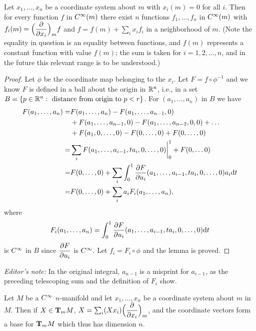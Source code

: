 \documentclass[../main]{subfiles}
\begin{document}
\begin{lemma} \label{lem:ch1.3.1}
Let $x_1, \dots, x_n$ be a coordinate system about $m$ with $x_i(m)=0$ for all $i$. Then for every function $f$ in $\CInfty(m)$ there exist $n$ functions $f_1, \dots, f_n$ in $\CInfty(m)$ with $f_i(m)=\Big(\pdv{}{x_i}\Big)_mf$ and $f=f(m)+\sum_i x_i f_i$ in a neighborhood of $m$. (Note the equality in question is an equality between functions, and $f(m)$ represents a constant function with value $f(m)$; the sum is taken for $i=1,2, \dots, n$, and in the future this relevant range is to be understood.)
\end{lemma}

\begin{proof}
Let $\phi$ be the coordinate map belonging to the $x_i$. Let $F=f\circ\phi^{-1}$ and we know $F$ is defined in a ball about the origin in $\bR^n$, i.e., in a set \newline $B=\{p\in\bR^n:\text{ distance from origin to }p<r\}$. For $(a_1,\dots,a_n)$ in $B$ we have
\begin{align*}
F(a_1, \dots, a_n)=&F(a_1, \dots, a_n)-F(a_1, \dots, a_{n-1}, 0)\\
&+F(a_1, \dots, a_{n-1}, 0)-F(a_1, \dots, a_{n-2}, 0,0)+\dots \\
&+F(a_1, 0, \dots, 0)-F(0, \dots, 0)+F(0, \dots, 0)\\
=&\sum_i F(a_1, \dots, a_{i-1}, ta_i, 0, \dots, 0)\bigg|_0^1+F(0, \dots 0) \\
=&F(0, \dots, 0)+\sum_i\int_0^1 \pdv{F}{u_i}(a_1, \dots, a_{i-1}, t a_i, 0, \dots, 0) a_i\dd t \\
=&F(0, \dots, 0)+\sum_i a_i F_i(a_1, \dots, a_n),
\end{align*}
where \[F_i(a_1, \dots, a_n)=\int_0^1\pdv{F}{u_i}(a_1, \dots, a_{i-1}, t a_i, 0, \dots, 0)\dd t\]
is $\CInfty$ in $B$ since $\pdv{F}{u_i}$ is $\CInfty$. Let $f_i=F_i\circ\phi$ and the lemma is proved.
\end{proof}
\noindent\emph{Editor's note:} In the original integral, $a_{n-1}$ is a misprint for $a_{i-1}$, as the preceding telescoping sum and the definition of $F_i$ show.


\begin{theorem} \label{thm:ch1.3.2}
Let $M$ be a $\CInfty$ $n$-manifold and let $x_1, \dots, x_n$ be a coordinate system about $m$ in $M$. Then if $X \in \tangentspace{M}{m}$, $X=\sum_i(Xx_i)\Big(\pdv{}{x_i}\Big)_m$, and the coordinate vectors form a base for $\tangentspace{M}{m}$ which thus has dimension $n$.
\end{theorem}
\end{document}
